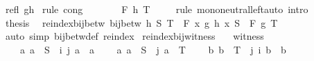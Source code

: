 \begin{isabellebody}
\ refl\ gh\ \isamarkupfalse%
{\isacharparenleft}{\kern0pt}rule\ cong{\isacharparenright}{\kern0pt}\isanewline
\ \ \isamarkupfalse%
\ \isamarkupfalse%
\ {\isachardoublequoteopen}{\isasymdots}\ {\isacharequal}{\kern0pt}\ F\ h\ T{\isachardoublequoteclose}\isanewline
\ \ \ \ \isamarkupfalse%
{\isacharparenleft}{\kern0pt}rule\ mono{\isacharunderscore}{\kern0pt}neutral{\isacharunderscore}{\kern0pt}left{\isacharparenright}{\kern0pt}{\isacharparenleft}{\kern0pt}auto\ intro{\isacharcolon}{\kern0pt}\ {\isacharasterisk}{\kern0pt}{\isacharparenright}{\kern0pt}\isanewline
\ \ \isamarkupfalse%
\ \isamarkupfalse%
\ {\isacharquery}{\kern0pt}thesis\ \isacommand{{\isachardot}{\kern0pt}}\isamarkupfalse%
\isanewline
{}\isamarkupfalse%
%
\endisatagproof
{\isafoldproof}%
%
\isadelimproof
\isanewline
%
\endisadelimproof
\isanewline
{}\isamarkupfalse%
\ reindex{\isacharunderscore}{\kern0pt}bij{\isacharunderscore}{\kern0pt}betw{\isacharcolon}{\kern0pt}\ {\isachardoublequoteopen}bij{\isacharunderscore}{\kern0pt}betw\ h\ S\ T\ {\isasymLongrightarrow}\ F\ {\isacharparenleft}{\kern0pt}{\isasymlambda}x{\isachardot}{\kern0pt}\ g\ {\isacharparenleft}{\kern0pt}h\ x{\isacharparenright}{\kern0pt}{\isacharparenright}{\kern0pt}\ S\ {\isacharequal}{\kern0pt}\ F\ g\ T{\isachardoublequoteclose}\isanewline
%
\isadelimproof
\ \ %
\endisadelimproof
%
\isatagproof
{}\isamarkupfalse%
\ {\isacharparenleft}{\kern0pt}auto\ simp{\isacharcolon}{\kern0pt}\ bij{\isacharunderscore}{\kern0pt}betw{\isacharunderscore}{\kern0pt}def\ reindex{\isacharparenright}{\kern0pt}%
\endisatagproof
{\isafoldproof}%
%
\isadelimproof
\isanewline
%
\endisadelimproof
\isanewline
{}\isamarkupfalse%
\ reindex{\isacharunderscore}{\kern0pt}bij{\isacharunderscore}{\kern0pt}witness{\isacharcolon}{\kern0pt}\isanewline
\ \ \ witness{\isacharcolon}{\kern0pt}\isanewline
\ \ \ \ {\isachardoublequoteopen}{\isasymAnd}a{\isachardot}{\kern0pt}\ a\ {\isasymin}\ S\ {\isasymLongrightarrow}\ i\ {\isacharparenleft}{\kern0pt}j\ a{\isacharparenright}{\kern0pt}\ {\isacharequal}{\kern0pt}\ a{\isachardoublequoteclose}\isanewline
\ \ \ \ {\isachardoublequoteopen}{\isasymAnd}a{\isachardot}{\kern0pt}\ a\ {\isasymin}\ S\ {\isasymLongrightarrow}\ j\ a\ {\isasymin}\ T{\isachardoublequoteclose}\isanewline
\ \ \ \ {\isachardoublequoteopen}{\isasymAnd}b{\isachardot}{\kern0pt}\ b\ {\isasymin}\ T\ {\isasymLongrightarrow}\ j\ {\isacharparenleft}{\kern0pt}i\ b{\isacharparenright}{\kern0pt}\ {\isacharequal}{\kern0pt}\ b{\isachardoublequoteclose}\isanewline

\end{isabellebody}
